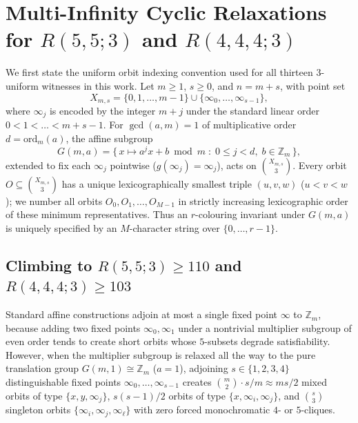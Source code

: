 \documentclass[11pt]{article}
\theoremstyle{remark}
\newcommand{\Z}{\mathbb{Z}}
\begin{document}
\section{Multi-Infinity Cyclic Relaxations for \texorpdfstring{$R(5,5;3)$ and $R(4,4,4;3)$}{R(5,5;3) and R(4,4,4;3)}}\label{sec:multiinf}

We first state the uniform orbit indexing convention used for all thirteen
$3$-uniform witnesses in this work. Let $m\ge 1$, $s\ge 0$, and $n=m+s$, with
point set
\[
  X_{m,s}=\{0,1,\dots,m-1\}\cup\{\infty_0,\dots,\infty_{s-1}\},
\]
where $\infty_j$ is encoded by the integer $m+j$ under the standard linear order
$0<1<\dots<m+s-1$. For $\gcd(a,m)=1$ of multiplicative order $d=\mathrm{ord}_m(a)$,
the affine subgroup
\[
  G(m,a)=\{\,x\mapsto a^j x+b\bmod m \;:\; 0\le j<d,\; b\in\Z_m\,\},
\]
extended to fix each $\infty_j$ pointwise ($g(\infty_j)=\infty_j$), acts on
$\binom{X_{m,s}}{3}$. Every orbit $O\subseteq\binom{X_{m,s}}{3}$ has a unique
lexicographically smallest triple $(u,v,w)$ ($u<v<w$); we number all orbits
$O_0,O_1,\dots,O_{M-1}$ in strictly increasing lexicographic order of these
minimum representatives. Thus an $r$-colouring invariant under $G(m,a)$ is
uniquely specified by an $M$-character string over $\{0,\dots,r-1\}$.

\subsection{Climbing to \texorpdfstring{$R(5,5;3)\ge 110$ and $R(4,4,4;3)\ge 103$}{R(5,5;3) >= 110 and R(4,4,4;3) >= 103}}

Standard affine constructions adjoin at most a single fixed point $\infty$ to
$\Z_m$, because adding two fixed points $\infty_0,\infty_1$ under a nontrivial
multiplier subgroup of even order tends to create short orbits whose $5$-subsets
degrade satisfiability. However, when the multiplier subgroup is relaxed all the
way to the pure translation group $G(m,1)\cong\Z_m$ ($a=1$), adjoining
$s\in\{1,2,3,4\}$ distinguishable fixed points $\infty_0,\dots,\infty_{s-1}$
creates $\binom{m}{2}\cdot s/m\approx ms/2$ mixed orbits of type $\{x,y,\infty_j\}$,
$s(s-1)/2$ orbits of type $\{x,\infty_i,\infty_j\}$, and $\binom{s}{3}$
singleton orbits $\{\infty_i,\infty_j,\infty_\ell\}$ with zero forced
monochromatic $4$- or $5$-cliques.
\end{document}
